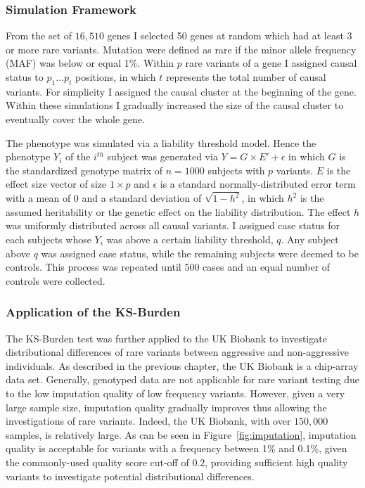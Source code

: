 \subsubsection{Simulation Framework}
\label{ssub:Simulation_Framework}
From the set of $16,510$ genes I selected 50 genes at random which had at least 3 or more rare variants. 
Mutation were defined as rare if the minor allele frequency (MAF) was below or equal 1\%. 
Within $p$ rare variants of a gene I assigned causal status to $p_1 \ldots p_t$ positions, in which $t$ represents the total number of causal variants.
For simplicity I assigned the causal cluster at the beginning of the gene.
Within these simulations I gradually increased the size of the causal cluster to eventually cover the whole gene. 

The phenotype was simulated via a liability threshold model.
Hence the phenotype $Y_i$ of the $i^{th}$ subject was generated via
$Y = G\times E' + \epsilon$
in which $G$ is the standardized genotype matrix of $n=1000$ subjects with $p$ variants.
$E$ is the effect size vector of size $1\times p$ and $\epsilon$ is a standard normally-distributed error term with a mean of $0$ and a standard deviation of $\sqrt{1-h^2}$, in which $h^2$ is the assumed heritability or the genetic effect on the liability distribution.
The effect $h$ was uniformly distributed across all causal variants.
I assigned case status for each subjects whose $Y_i$ was above a certain liability threshold, $q$.
Any subject above $q$ was assigned case status, while the remaining subjects were deemed to be controls.
This process was repeated until $500$ cases and an equal number of controls were collected.

\subsubsection{Application of the KS-Burden}
\label{ssub:Application_of_the_KS-Burden}
The KS-Burden test was further applied to the UK Biobank to investigate distributional differences of rare variants between aggressive and non-aggressive individuals.
As described in the previous chapter, the UK Biobank is a chip-array data set.
Generally, genotyped data are not applicable for rare variant testing due to the low imputation quality of low frequency variants.
However, given a very large sample size, imputation quality  gradually improves thus allowing the investigations of rare variants.
Indeed, the UK Biobank, with over $150,000$ samples, is relatively large.
As can be seen in Figure~\ref{fig:imputation}, imputation quality is acceptable for variants with a frequency between 1\% and 0.1\%, given the commonly-used quality score cut-off of $0.2$,
providing sufficient high quality variants to investigate potential distributional differences.

